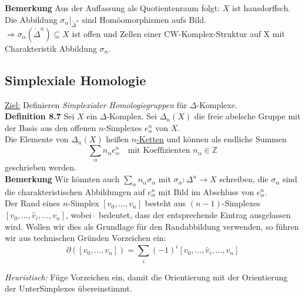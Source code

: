 \documentclass[fleqn, 12pt, letterpaper]{article}
\begin{document}
\textbf{Bemerkung}
Aus der Auffassung als Quotientenraum folgt: $X$ ist hausdorffsch. \\

Die Abbildung $\sigma_\alpha \vert_{\mathring{\Delta}^n}$ sind Homöomorphismen {aufs Bild}.\\

\(
\Rightarrow\sigma_\alpha(\mathring{\Delta}^n) \subseteq X \)  ist offen und Zellen einer CW-Komplex-Struktur auf X mit Charakteristik Abbildung $\sigma_\alpha$.



\subsection{Simplexiale Homologie}

\underline{Ziel:} Definieren \emph{Simplexialer Homologiegruppen} für $\Delta$-Komplexe.\\

\textbf{Definition 8.7}
Sei $X$ ein $\Delta$-Komplex. Sei $\Delta_n(X)$ die freie abelsche Gruppe mit der Basis aus den offenen $n$-Simplexes $e^n_\alpha$ von $X$. \\
Die Elemente von $\Delta_n(X)$ heißen \underline{$n$-Ketten} und können als endliche Summen 
\[
\sum_\alpha n_\alpha e^n_\alpha \quad \text{mit Koeffizienten } n_\alpha \in \mathbb{Z}
\]
geschrieben werden.\\

\textbf{Bemerkung}
Wir könnten auch $\sum_\alpha n_\alpha \sigma_\alpha$ mit $\sigma_\alpha \colon \Delta^n \to X$ schreiben, 
die $\sigma_\alpha$ sind die charakteristischen Abbildungen auf $e^n_\alpha$ mit Bild im Abschluss von $e^n_\alpha$. \\

Der Rand eines $n$-Simplex $[v_0, \dots, v_n]$ besteht aus $(n{-}1)$-Simplexes \([v_0, \dots, \hat{v}_i, \dots, v_n]\),
wobei $\hat{\ }$ bedeutet, dass der entsprechende Eintrag ausgelassen wird. Wollen wir dies als Grundlage für den Randabbildung verwenden, so führen wir aus technischen Gründen Vorzeichen ein:
\[
\partial([v_0, \dots, v_n]) = \sum_i (-1)^i [v_0, \dots, \hat{v}_i, \dots, v_n]
\]

\emph{Heuristisch:} Füge Vorzeichen ein, damit die Orientierung mit der Orientierung der UnterSimplexes übereinstimmt.
\end{document}
